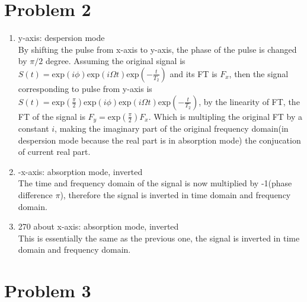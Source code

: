 \documentclass[11pt]{article}
\begin{document}
\section*{Problem 2}

\begin{enumerate}[label=(\alph*)]
    \item y-axis: despersion mode\\

    By shifting the pulse from x-axis to y-axis, the phase of the pulse is changed by $\pi/2$ degree. Assuming the original signal is $S(t) = \text{exp}(i\phi)\text{exp}(i\Omega t)\text{exp}(-\frac{t}{T_2})$ and its FT is $F_x$, then the signal corresponding to pulse from y-axis is $S(t) = \text{exp}(\frac{\pi}{2})\text{exp}(i\phi)\text{exp}(i\Omega t)\text{exp}(-\frac{t}{T_2})$, by the linearity of FT, the FT of the signal is $F_y = \text{exp}(\frac{\pi}{2})F_x$. Which is multipling the original FT by a constant $i$, making the imaginary part of the original frequency domain(in despersion mode because the real part is in absorption mode) the conjucation of current real part.\\

    \item -x-axis: absorption mode, inverted\\

    The time and frequency domain of the signal is now multiplied by -1(phase difference $\pi$), therefore the signal is inverted in time domain and frequency domain.\\

    \item 270 about x-axis: absorption mode, inverted\\

    This is essentially the same as the previous one, the signal is inverted in time domain and frequency domain.\\
\end{enumerate}

\section*{Problem 3}
\end{document}

